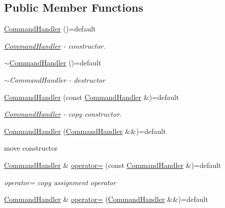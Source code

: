 \subsection*{Public Member Functions}
\begin{DoxyCompactItemize}
\item 
\hyperlink{a00003_a65cf4692821f3207a8db5653a531327f_a65cf4692821f3207a8db5653a531327f}{Command\+Handler} ()=default
\begin{DoxyCompactList}\small\item\em \hyperlink{a00003}{Command\+Handler} -\/ constructor. \end{DoxyCompactList}\item 
\hyperlink{a00003_a6921219aa860305c8c39feffa2e3ee3b_a6921219aa860305c8c39feffa2e3ee3b}{$\sim$\+Command\+Handler} ()=default
\begin{DoxyCompactList}\small\item\em $\sim$\+Command\+Handler -\/ destructor \end{DoxyCompactList}\item 
\hyperlink{a00003_a98c7fbeab225fbd65b80ad3b7c19240e_a98c7fbeab225fbd65b80ad3b7c19240e}{Command\+Handler} (const \hyperlink{a00003}{Command\+Handler} \&)=default
\begin{DoxyCompactList}\small\item\em \hyperlink{a00003}{Command\+Handler} -\/ copy constructor. \end{DoxyCompactList}\item 
\hyperlink{a00003_ab7256adfaa1dddd182a3804e0acec7e7_ab7256adfaa1dddd182a3804e0acec7e7}{Command\+Handler} (\hyperlink{a00003}{Command\+Handler} \&\&)=default
\begin{DoxyCompactList}\small\item\em 
\begin{DoxyItemize}
\item move constructor 
\end{DoxyItemize}\end{DoxyCompactList}\item 
\hyperlink{a00003}{Command\+Handler} \& \hyperlink{a00003_ae6548e23d4d81d26a6b1378b1581789d_ae6548e23d4d81d26a6b1378b1581789d}{operator=} (const \hyperlink{a00003}{Command\+Handler} \&)=default
\begin{DoxyCompactList}\small\item\em operator= copy assignment operator \end{DoxyCompactList}\item 
\hyperlink{a00003}{Command\+Handler} \& \hyperlink{a00003_a98d4451d4b3bc4426b358d3bb9e6e61f_a98d4451d4b3bc4426b358d3bb9e6e61f}{operator=} (\hyperlink{a00003}{Command\+Handler} \&\&)=default

\end{DoxyCompactItemize}
